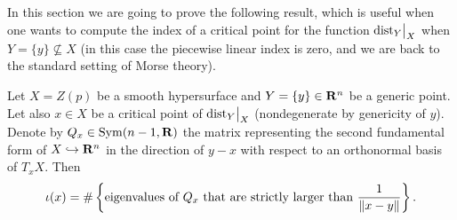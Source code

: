 In this section we are going to prove the following result, which is useful when one wants to compute the index of a critical point for the function $\mathord{\operatorname{dist}}_Y\big|_X$ when $Y=\{y\}\not\subseteq X$ (in this case the piecewise linear index is zero, and we are back to the standard setting of Morse theory).

\begin{proposition}
  Let $X=Z(p)$ be a smooth hypersurface and $Y=\{y\}\in \mathbf{R}^n$ be a generic point. Let also $x\in X$ be a critical point of $\mathord{\operatorname{dist}}_Y\big|_X$ (nondegenerate by genericity of $y$). Denote by $Q_x\in \mathrm{Sym}(n-1, \mathbf{R})$ the matrix representing the second fundamental form of $X\hookrightarrow \mathbf{R}^n$ in the direction of $y-x$ with respect to an orthonormal basis of $T_xX$. Then
  \[
    \iota(x)=\#\left\{\textnormal{eigenvalues of $Q_x$ that are strictly larger than $\frac{1}{\|x-y\|}$}\right\}.
  \]
\end{proposition}

